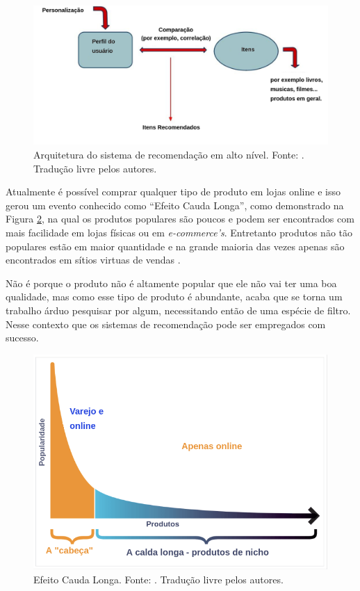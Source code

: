 \begin{figure}[H]
    \centering
    \includegraphics[scale=0.35]{figuras/referencial_teorico/sr_arquitetura.png}
    \caption[Arquitetura do sistema de recomendação em alto nível]{Arquitetura do sistema de recomendação em alto nível. Fonte: \cite{Stefanos:2008}. Tradução livre pelos autores.}
    \label{fig:sr_arquitetura}
\end{figure}

Atualmente é possível comprar qualquer tipo de produto em lojas online e isso gerou um evento conhecido como “Efeito Cauda Longa'', como demonstrado na Figura \ref{fig:efeito_cauda}, na qual os produtos populares são poucos e podem ser encontrados com mais facilidade em lojas físicas ou em \textit{e-commerce’s}. Entretanto produtos não tão populares estão em maior quantidade e na grande maioria das vezes apenas são encontrados em sítios virtuas de vendas \cite{pandey:2019}.

Não é porque o produto não é altamente popular que ele não vai ter uma boa qualidade, mas como esse tipo de produto é abundante, acaba que se torna um trabalho árduo pesquisar por algum, necessitando então de uma espécie de filtro. Nesse contexto que os sistemas de recomendação pode ser empregados com sucesso.

\begin{figure}[H]
    \centering
    \includegraphics[scale=0.35]{figuras/referencial_teorico/efeito_cauda.png}
    \caption[Efeito Cauda Longa]{Efeito Cauda Longa. Fonte: \cite{pandey:2019}. Tradução livre pelos autores.}
    \label{fig:efeito_cauda}
\end{figure}

